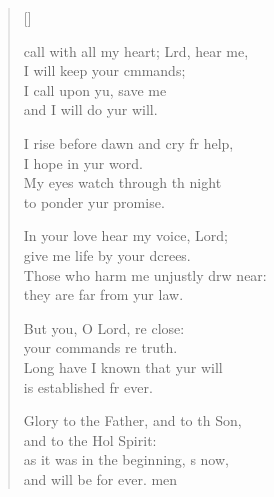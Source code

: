 \settowidth{\versewidth}{I call with all my heart; Lord, hear me, *}
\begin{verse}[\versewidth]
  \begin{patverse}
     call with all my heart; Lrd, hear me,\Med\\
I will keep your cmmands;\\
I call upon yu, save me\Med\\
and I will do yur will.

I rise before dawn and cry fr help,\Med\\
I hope in yur word.\\
My eyes watch through th night\Med\\
to ponder yur promise.

In your love hear my voice,  Lord;\Med\\
give me life by your dcrees.\\
Those who harm me unjustly drw near:\Med\\
they are far from yur law.

But you, O Lord, re close:\Med\\
your commands re truth.\\
Long have I known that yur will\Med\\
is established fr ever.

Glory to the Father, and to th Son,\Med\\
and to the Hol Spirit:\\
as it was in the beginning, \pointup{\i}s now,\Med\\
and will be for ever. men
  \end{patverse}
\end{verse}
